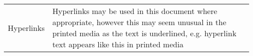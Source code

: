 
\label{sec:Document Conventions}

\begin{tabular}{p{25mm}p{135mm}}
Hyperlinks&Hyperlinks may be used in this document where appropriate, however this may seem unusual in the printed media as the text is underlined, e.g.
hyperlink text appears like this in printed media
\\
\end{tabular}
